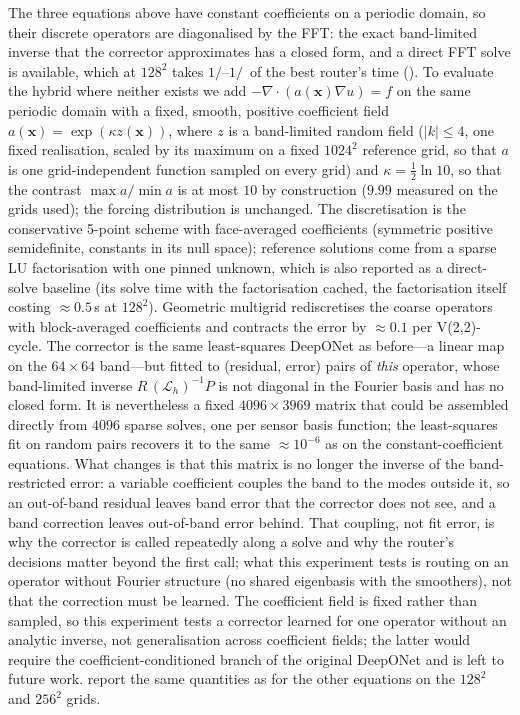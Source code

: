 The three equations above have constant coefficients on a periodic domain, so their discrete operators are diagonalised by the FFT: the exact band-limited inverse that the corrector approximates has a closed form, and a direct FFT solve is available, which at $128^2$ takes $1/$\caFftRatioMax--$1/$\caFftRatioMin\ of the best router's time (). To evaluate the hybrid where neither exists we add $-\nabla\cdot(a(\mathbf{x})\nabla u) = f$ on the same periodic domain with a fixed, smooth, positive coefficient field $a(\mathbf{x}) = \exp(\kappa z(\mathbf{x}))$, where $z$ is a band-limited random field ($|k| \le 4$, one fixed realisation, scaled by its maximum on a fixed $1024^2$ reference grid, so that $a$ is one grid-independent function sampled on every grid) and $\kappa = \tfrac12\ln 10$, so that the contrast $\max a / \min a$ is at most $10$ by construction ($9.99$ measured on the grids used); the forcing distribution is unchanged. The discretisation is the conservative 5-point scheme with face-averaged coefficients (symmetric positive semidefinite, constants in its null space); reference solutions come from a sparse LU factorisation with one pinned unknown, which is also reported as a direct-solve baseline (its solve time with the factorisation cached, the factorisation itself costing $\approx 0.5$\,s at $128^2$). Geometric multigrid rediscretises the coarse operators with block-averaged coefficients and contracts the error by $\approx 0.1$ per V(2,2)-cycle. The corrector is the same least-squares DeepONet as before---a linear map on the $64\times64$ band---but fitted to (residual, error) pairs of \emph{this} operator, whose band-limited inverse $R\,(\mathcal{L}_h)^{-1}P$ is not diagonal in the Fourier basis and has no closed form. It is nevertheless a fixed $4096 \times 3969$ matrix that could be assembled directly from $4096$ sparse solves, one per sensor basis function; the least-squares fit on random pairs recovers it to the same $\approx 10^{-6}$ as on the constant-coefficient equations. What changes is that this matrix is no longer the inverse of the band-restricted error: a variable coefficient couples the band to the modes outside it, so an out-of-band residual leaves band error that the corrector does not see, and a band correction leaves out-of-band error behind. That coupling, not fit error, is why the corrector is called repeatedly along a solve and why the router's decisions matter beyond the first call; what this experiment tests is routing on an operator without Fourier structure (no shared eigenbasis with the smoothers), not that the correction must be learned. The coefficient field is fixed rather than sampled, so this experiment tests a corrector learned for one operator without an analytic inverse, not generalisation across coefficient fields; the latter would require the coefficient-conditioned branch of the original DeepONet and is left to future work.  report the same quantities as for the other equations on the $128^2$ and $256^2$ grids.

